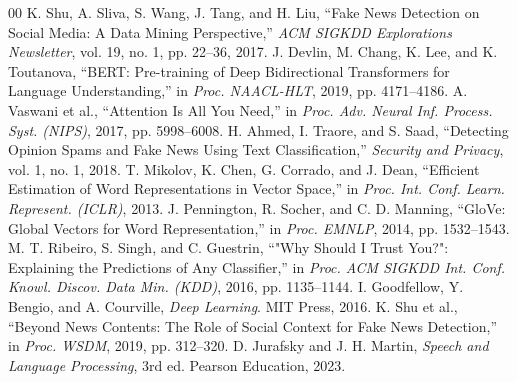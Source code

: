 \documentclass[conference]{IEEEtran}
\begin{document}
\begin{thebibliography}{00}
 K. Shu, A. Sliva, S. Wang, J. Tang, and H. Liu, ``Fake News Detection on Social Media: A Data Mining Perspective,'' \textit{ACM SIGKDD Explorations Newsletter}, vol. 19, no. 1, pp. 22--36, 2017.
 J. Devlin, M. Chang, K. Lee, and K. Toutanova, ``BERT: Pre-training of Deep Bidirectional Transformers for Language Understanding,'' in \textit{Proc. NAACL-HLT}, 2019, pp. 4171--4186.
 A. Vaswani et al., ``Attention Is All You Need,'' in \textit{Proc. Adv. Neural Inf. Process. Syst. (NIPS)}, 2017, pp. 5998--6008.
 H. Ahmed, I. Traore, and S. Saad, ``Detecting Opinion Spams and Fake News Using Text Classification,'' \textit{Security and Privacy}, vol. 1, no. 1, 2018.
 T. Mikolov, K. Chen, G. Corrado, and J. Dean, ``Efficient Estimation of Word Representations in Vector Space,'' in \textit{Proc. Int. Conf. Learn. Represent. (ICLR)}, 2013.
 J. Pennington, R. Socher, and C. D. Manning, ``GloVe: Global Vectors for Word Representation,'' in \textit{Proc. EMNLP}, 2014, pp. 1532--1543.
 M. T. Ribeiro, S. Singh, and C. Guestrin, ``"Why Should I Trust You?": Explaining the Predictions of Any Classifier,'' in \textit{Proc. ACM SIGKDD Int. Conf. Knowl. Discov. Data Min. (KDD)}, 2016, pp. 1135--1144.
 I. Goodfellow, Y. Bengio, and A. Courville, \textit{Deep Learning}. MIT Press, 2016.
 K. Shu et al., ``Beyond News Contents: The Role of Social Context for Fake News Detection,'' in \textit{Proc. WSDM}, 2019, pp. 312--320.
 D. Jurafsky and J. H. Martin, \textit{Speech and Language Processing}, 3rd ed. Pearson Education, 2023.
\end{thebibliography}
\end{document}
